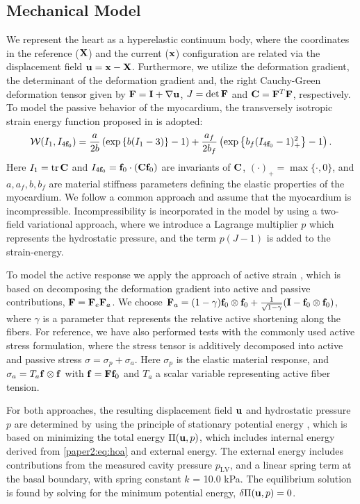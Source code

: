 \subsection{Mechanical Model}
We represent the heart as a hyperelastic continuum body, where the coordinates in
the reference ($\mathbf{X}$) and the current ($\mathbf{x}$) configuration are
related via the displacement field $\mathbf{u} = \mathbf{x}-\mathbf{X}$. Furthermore,
we utilize the
deformation gradient, the determinant of the deformation gradient
and, the right Cauchy-Green deformation tensor given by $\mathbf{F}= \mathbf{I}+\nabla
\mathbf{u} $,  $J = \det \mathbf{F}$ and $\mathbf{C} = \mathbf{F}^T\mathbf{F}$, respectively. 
To model the passive behavior of the myocardium, the transversely 
isotropic strain energy function proposed in  \cite{holzapfel2009constitutive} is adopted:
\begin{align}
\label{paper2:eq:hoa}
  \mathcal{W}(I_1, I_{4\mathbf{f}_0}) = \frac{a}{2 b} \left( \exp\left\{ b (I_1 
  - 3)\right\}  -1 \right)
  + \frac{a_f}{2 b_f} \left( \exp\left\{ b_f (I_{4\mathbf{f}_0} 
  - 1)_+^2\right\} -1 \right).
\end{align}
Here $I_1 = \mathrm{tr} \hspace{0.05cm} \mathbf{C}$ and $I_{4\mathbf{f}_0}= \mathbf{f}_0 \cdot (\mathbf{C} \mathbf{f}_0)$ are invariants
of $\mathbf{C}$, $(\cdotp)_{+}  = \max\{\cdot, 0\}$, and $a, a_f, b, b_f$ are
material stiffness parameters defining the elastic properties of the myocardium.
We follow a common approach and assume that the myocardium is incompressible. 
Incompressibility is incorporated in the model by using a two-field variational 
approach, where we introduce a Lagrange multiplier $p$ which represents the 
hydrostatic pressure, and the term $p(J-1)$ is added to the strain-energy.

To model the active response we apply the approach of active strain
\cite{ambrosi2012active}, which is based on decomposing
the deformation gradient into active and passive contributions, $\mathbf{F} =
\mathbf{F}_e \mathbf{F}_a$. We choose $\mathbf{F}_a = (1 - \gamma) \mathbf{f}_0 \otimes \mathbf{f}_0 +
\frac{1}{\sqrt{1 - \gamma}} (\mathbf{I} - \mathbf{f}_0 \otimes \mathbf{f}_0)$, where $\gamma$
is a parameter that represents the relative active shortening along
the fibers. For reference, we have also performed tests with the
commonly used active stress formulation, where the stress tensor 
is additively decomposed into active and passive stress $\sigma =
\sigma_p + \sigma_a$. Here $\sigma_p$ is
the elastic material response, and $\sigma_a = T_a \mathbf{f} \otimes \mathbf{f}$ with
$\mathbf{f} = \mathbf{F}\mathbf{f}_0$ and $T_a$ a scalar variable representing active fiber
tension.


For both approaches, the resulting displacement field $\mathbf{u}$ and hydrostatic pressure $p$
are determined by using the principle of stationary potential energy
\cite{holzapfel2000nonlinear}, which is based on minimizing the total
energy  $\Pi(\mathbf{u}, p)$, which includes internal energy derived from
\eqref{paper2:eq:hoa} and external energy. The external energy includes
contributions from the measured cavity pressure $p_{\text{LV}}$, and a
linear spring term at the basal boundary, with spring constant
$k$ = 10.0 kPa. The equilibrium solution is found by solving for the minimum
potential energy, $\delta\Pi(\mathbf{u}, p) = 0$. 

